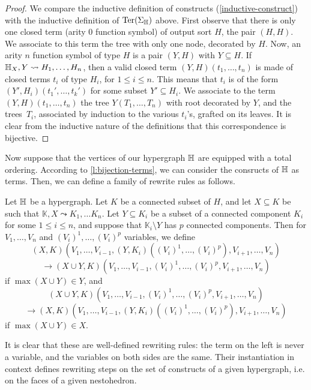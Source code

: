 \begin{proof}
  We compare the inductive definition of constructs (\cref{inductive-construct}) with the inductive definition of $\operatorname{Ter}(\Sigma_{\mathbb H})$ above.
  First observe that there is only one closed term (arity $0$ function symbol) of output sort $H$, the pair $(H,H)$. 
  We associate to this term the tree with only one node, decorated by $H$.
  Now, an arity $n$ function symbol of type $H$ is a pair $(Y,H)$ with $Y \subseteq H$. 
  If ${\mathbb H}_X,Y \leadsto H_1,\ldots,H_n$, then a valid closed term $(Y,H)(t_1,\ldots,t_n)$ is made of closed terms $t_i$ of type $H_i$, for $1 \leq i \leq n$. 
  This means that $t_i$ is of the form $(Y',H_i)(t_1',\ldots,t_k')$ for some subset $Y' \subseteq H_i$. 
  We associate to the term $(Y,H)(t_1,\ldots,t_n)$ the tree $Y(T_1,\ldots,T_n)$ with root decorated by $Y$, and the trees~$T_i$, associated by induction to the various $t_i$'s, grafted on its leaves.
  It is clear from the inductive nature of the definitions that this correspondence is bijective.
\end{proof}

Now suppose that the vertices of our hypergraph ${\mathbb H}$ are equipped with a total ordering.
According to \cref{l:bijection-terms}, we can consider the consructs of ${\mathbb H}$ as terms. 
Then, we can define a family of rewrite rules as follows.

\begin{definition} \label{def:rules}
  Let ${\mathbb H}$ be a hypergraph. 
  Let $K$ be a connected subset of $H$, and let $X \subseteq K$ be such that $\mathbb{K},X \leadsto K_1,\ldots K_n$.
  Let $Y \subseteq K_i$ be a subset of a connected component $K_i$ for some $1 \leq i \leq n$, and suppose that $\mathbb{K}_i\setminus Y$ has $p$ connected components. 
  Then for $V_1,\ldots,V_n$ and $(V_i)^1,\ldots,(V_i)^p$ variables, we define 
  $$(X,K)(V_1,\ldots, V_{i-1},(Y,K_i)((V_i)^1,\ldots, (V_i)^p),V_{i+1},\ldots,V_n)$$
  $$ \longrightarrow (X\cup Y,K)(V_1,\ldots,V_{i-1},(V_i)^1,\ldots, (V_i)^p,V_{i+1},\ldots,V_n)$$
  if $\max(X\cup Y)\in Y$, and 
  $$(X\cup Y,K)(V_1,\ldots,V_{i-1},(V_i)^1,\ldots, (V_i)^p,V_{i+1},\ldots,V_n)$$
  $$\longrightarrow (X,K)(V_1,\ldots, V_{i-1},(Y,K_i)((V_i)^1,\ldots, (V_i)^p),V_{i+1},\ldots,V_n)$$
  if $\max(X\cup Y)\in X$.
\end{definition} 

It is clear that these are well-defined rewriting rules: the term on the left is never a variable, and the variables on both sides are the same.
Their instantiation in context defines rewriting steps on the set of constructs of a given hypergraph, i.e. on the faces of a given nestohedron.

